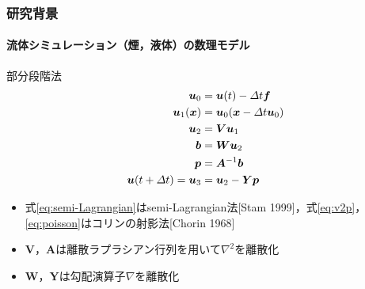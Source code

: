 \documentclass[aspectratio=169,dvipdfmx,hyperref={bookmarks=true}]{beamer}
\begin{document}
  \begin{frame}
  \frametitle{研究背景}
  \framesubtitle{流体シミュレーション（煙，液体）の数理モデル}
    \begin{block}{部分段階法}
\begin{align}
	\bm{u}_0	& =  \bm{u} (t)  - \varDelta t \bm{f}\notag \\ 
	\bm{u}_1(\bm{x}) 	&= \bm{u}_0(\bm{x}  - \varDelta t \bm{u}_0)\label{eq:semi-Lagrangian}\\
	\bm{u}_2   		&=  \bm{V}\bm{u}_1		\notag\\
	\bm{b} 			&= \bm{W}\bm{u}_2		\label{eq:v2p}	\\ 
	\bm{p} 			&= \bm{A}^{-1}\bm{b}	\label{eq:poisson} \\ 
	\bm{u} (t + \varDelta t) = \bm{u}_3  	&=  \bm{u}_2 - \bm{Y}\bm{p}\notag
\end{align}
\begin{itemize}
\item 式\ref{eq:semi-Lagrangian}はsemi-Lagrangian法[Stam 1999]，式\ref{eq:v2p}，\ref{eq:poisson}はコリンの射影法[Chorin 1968]
\item $\bm{V}$，$\bm{A}$は離散ラプラシアン行列を用いて$\nabla^2$を離散化
\item $\bm{W}$，$\bm{Y}$は勾配演算子$\nabla$を離散化
\end{itemize}
\end{block}
\end{frame}
\end{document}
